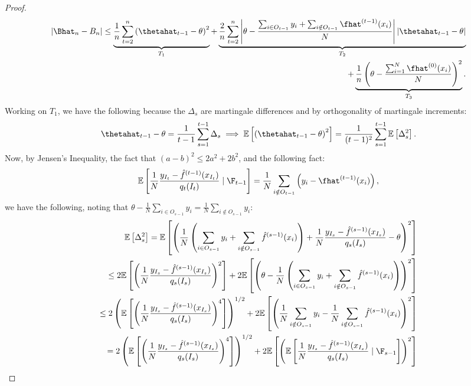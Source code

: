 \documentclass[11pt]{article}
\begin{document}
\begin{proof}
    \begin{align*}
        |\Bhat_n - B_n| \leq \underbrace{\frac{1}{n} \sum_{t=2}^n \left( \thetahat_{t-1} - \theta \right)^2}_{T_1} + \underbrace{\frac{2}{n} \sum_{t=2}^n \left| \theta - \frac{\sum_{i \in O_{t-1}} y_i + \sum_{i \notin O_{t-1}} \fhat^{(t-1)}(x_i)}{N} \right| \left| \thetahat_{t-1} - \theta \right|}_{T_2}\\ + \underbrace{\frac{1}{n} \left( \theta - \frac{\sum_{i=1}^N \fhat^{(0)}(x_i)}{N} \right)^2}_{T_3}.
    \end{align*}
    Working on $T_1$, we have the following because the $\Delta_s$ are martingale differences and by orthogonality of martingale increments:
    \begin{align*}
        \thetahat_{t-1} - \theta = \frac{1}{t-1} \sum_{s=1}^{t-1} \Delta_s \implies \mathbb{E}\left[ \left(  \thetahat_{t-1} - \theta \right)^2\right] = \frac{1}{(t-1)^2} \sum_{s=1}^{t-1} \mathbb{E}\left[ \Delta_s^2 \right].
    \end{align*}
    Now, by Jensen's Inequality, the fact that $(a - b)^2 \leq 2a^2 + 2b^2$, and the following fact:
    \begin{align*}
        \mathbb{E}\left[ \frac{1}{N}\frac{y_{I_t} - \hat{f}^{(t-1)}(x_{I_t})}{q_t(I_t)} \mid \F_{t-1} \right] = \frac{1}{N} \sum_{i \notin O_{t-1}} \left( y_i - \fhat^{(t-1)}(x_i) \right),
    \end{align*}
    we have the following, noting that $\theta - \frac{1}{N} \sum_{i \in O_{s-1}} y_i = \frac{1}{N} \sum_{i \notin O_{s-1}} y_i$:
    \begin{align*}
        \mathbb{E}\left[ \Delta_s^2 \right] = \mathbb{E}\left[ \left( \frac{1}{N}\left( \sum_{i \in O_{s-1}} y_i + \sum_{i \notin O_{s-1}} \hat{f}^{(s-1)}(x_{i}) \right) + \frac{1}{N}\frac{y_{I_s} - \hat{f}^{(s-1)}(x_{I_s})}{q_s(I_s)} - \theta \right)^2 \right]\\
        \leq 2\mathbb{E}\left[ \left( \frac{1}{N}\frac{y_{I_s} - \hat{f}^{(s-1)}(x_{I_s})}{q_s(I_s)} \right)^2 \right] + 2\mathbb{E}\left[ \left( \theta - \frac{1}{N}\left( \sum_{i \in O_{s-1}} y_i + \sum_{i \notin O_{s-1}} \hat{f}^{(s-1)}(x_{i}) \right) \right)^2 \right]\\
        \leq 2\left(\mathbb{E}\left[ \left( \frac{1}{N}\frac{y_{I_s} - \hat{f}^{(s-1)}(x_{I_s})}{q_s(I_s)} \right)^4 \right]\right)^{1/2} + 2\mathbb{E}\left[ \left( \frac{1}{N} \sum_{i \notin O_{s-1}} y_i - \frac{1}{N} \sum_{i \notin O_{s-1}} \hat{f}^{(s-1)}(x_{i}) \right)^2 \right]\\
        = 2\left(\mathbb{E}\left[ \left( \frac{1}{N}\frac{y_{I_s} - \hat{f}^{(s-1)}(x_{I_s})}{q_s(I_s)} \right)^4 \right]\right)^{1/2} + 2\mathbb{E}\left[ \left(  \mathbb{E}\left[ \frac{1}{N}\frac{y_{I_s} - \hat{f}^{(s-1)}(x_{I_s})}{q_s(I_s)} \mid \F_{s-1} \right] \right)^2 \right]\\

\end{align*}
\end{proof}
\end{document}
